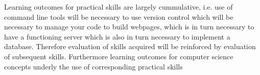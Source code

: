 \documentclass{article}
\begin{document}
Learning outcomes for practical skills are largely cummulative, i.e. use of
command line tools will be necessary to use version control which will be
necessary to manage your code to build webpages, which is in turn necessary to
have a functioning server which is also in turn necessary to implement a
database. Therefore evaluation of skills acquired will be reinforced by
evaluation of subsequent skills. Furthermore learning outcomes for computer
science concepts underly the use of corresponding practical skills
\end{document}
